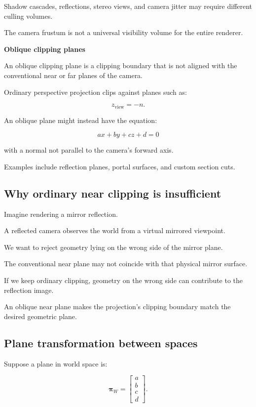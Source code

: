 Shadow cascades, reflections, stereo views, and camera jitter may require different culling volumes.

The camera frustum is not a universal visibility volume for the entire renderer.

\textbf{Oblique clipping planes}

An oblique clipping plane is a clipping boundary that is not aligned with the conventional near or far planes of the camera.

Ordinary perspective projection clips against planes such as:

\[
 z_{\mathrm{view}}=-n.
\]

An oblique plane might instead have the equation:

\[
 \boxed{ ax+by+cz+d=0 }
\]

with a normal not parallel to the camera's forward axis.

Examples include reflection planes, portal surfaces, and custom section cuts.

\subsection{Why ordinary near clipping is insufficient}\label{02-foundations-ii-ch034-why-ordinary-near-clipping-is-insufficient}

Imagine rendering a mirror reflection.

A reflected camera observes the world from a virtual mirrored viewpoint.

We want to reject geometry lying on the wrong side of the mirror plane.

The conventional near plane may not coincide with that physical mirror surface.

If we keep ordinary clipping, geometry on the wrong side can contribute to the reflection image.

An oblique near plane makes the projection's clipping boundary match the desired geometric plane.

\subsection{Plane transformation between spaces}\label{02-foundations-ii-ch034-plane-transformation-between-spaces}

Suppose a plane in world space is:

\[
 \boldsymbol\pi_W= \begin{bmatrix} a\\b\\c\\d \end{bmatrix}.
\]

